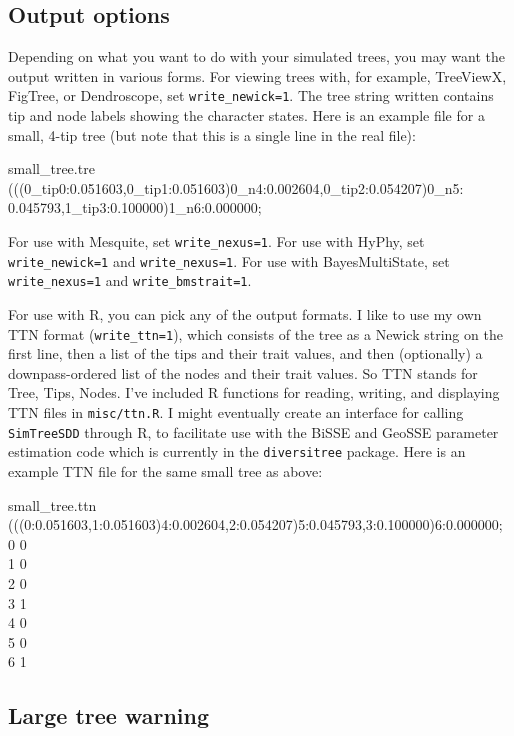 \documentclass[10pt]{article}
\begin{document}
\subsection*{Output options}

Depending on what you want to do with your simulated trees, you may want the output written in various forms.  
For viewing trees with, for example, TreeViewX, FigTree, or Dendroscope, set \texttt{write\_newick=1}.
The tree string written contains tip and node labels showing the character states.  Here is an example file for a small, 4-tip tree (but note that this is a single line in the real file):
\begin{filesays}{small\_tree.tre}
(((0\_tip0:0.051603,0\_tip1:0.051603)0\_n4:0.002604,0\_tip2:0.054207)0\_n5:\\0.045793,1\_tip3:0.100000)1\_n6:0.000000;
\end{filesays}

For use with Mesquite, set \texttt{write\_nexus=1}.
For use with HyPhy, set \texttt{write\_newick=1} and \texttt{write\_nexus=1}.
For use with BayesMultiState, set \texttt{write\_nexus=1} and \texttt{write\_bmstrait=1}.

For use with R, you can pick any of the output formats.
I like to use my own TTN format (\texttt{write\_ttn=1}), which consists of the tree as a Newick string on the first line, then a list of the tips and their trait values, and then (optionally) a downpass-ordered list of the nodes and their trait values.
So TTN stands for Tree, Tips, Nodes.
I've included R functions for reading, writing, and displaying TTN files in \texttt{misc/ttn.R}.
I might eventually create an interface for calling \texttt{SimTreeSDD} through R, to facilitate use with the BiSSE and GeoSSE parameter estimation code which is currently in the \texttt{diversitree} package.
Here is an example TTN file for the same small tree as above:
\begin{filesays}{small\_tree.ttn}
(((0:0.051603,1:0.051603)4:0.002604,2:0.054207)5:0.045793,3:0.100000)6:0.000000; \\
0    0	\\
1    0	\\
2    0	\\
3    1	\\
4    0	\\
5    0	\\
6    1
\end{filesays}


\subsection*{Large tree warning}
\end{document}
